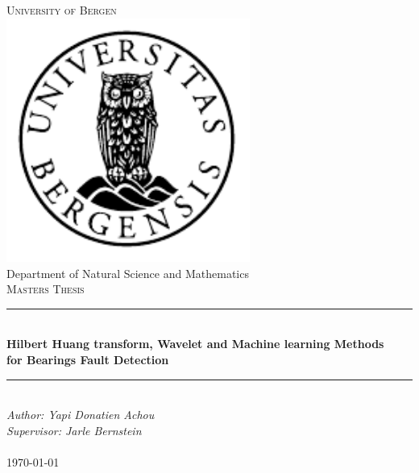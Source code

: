 \documentclass[../Main/thesis.tex]{subfiles}
\begin{document}

\newcommand{\HRule}{\rule{\linewidth}{0.5mm}}

\begin{titlepage}
\begin{center}
\textsc{\Huge University of Bergen}\\[0.4cm]
\includegraphics[width=8cm]{../fig/uib} \\[0.5cm]

\large Department of Natural Science and Mathematics\\[0.7cm]
\textsc{\huge Masters Thesis}\\[0.4cm]
\HRule \\[0.4cm]
{ \huge \bfseries Hilbert Huang transform, Wavelet and Machine learning Methods\\ for Bearings Fault Detection}\\[0.5cm]
\HRule \\[1.0cm]

\emph{Author: Yapi Donatien Achou}\\
\emph{Supervisor: Jarle Bernstein}\\

\paragraph*{}
\end{center}
\vfill
\begin{center}
{\large \today}
\end{center}
\end{titlepage}
\end{document}
